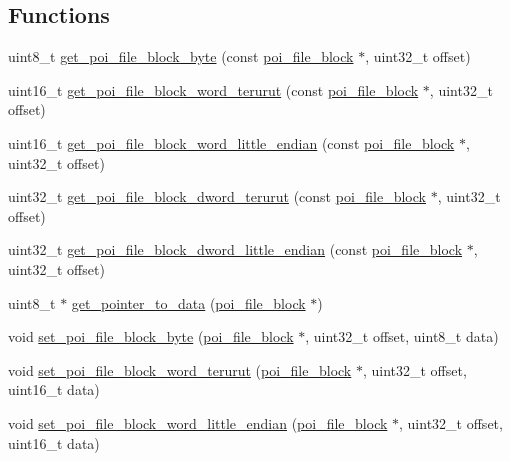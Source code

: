 \subsection*{Functions}
\begin{DoxyCompactItemize}
\item 
uint8\-\_\-t \hyperlink{file-manager_8h_a7583daf78dde7ba0c00ebd4f71e567c8}{get\-\_\-poi\-\_\-file\-\_\-block\-\_\-byte} (const \hyperlink{structpoi__file__block}{poi\-\_\-file\-\_\-block} $\ast$, uint32\-\_\-t offset)
\item 
uint16\-\_\-t \hyperlink{file-manager_8h_af304d02f29847f8e3cb2ba0f4d1a73e2}{get\-\_\-poi\-\_\-file\-\_\-block\-\_\-word\-\_\-terurut} (const \hyperlink{structpoi__file__block}{poi\-\_\-file\-\_\-block} $\ast$, uint32\-\_\-t offset)
\item 
uint16\-\_\-t \hyperlink{file-manager_8h_a359659add1dc2b5b76a93188eb0a1808}{get\-\_\-poi\-\_\-file\-\_\-block\-\_\-word\-\_\-little\-\_\-endian} (const \hyperlink{structpoi__file__block}{poi\-\_\-file\-\_\-block} $\ast$, uint32\-\_\-t offset)
\item 
uint32\-\_\-t \hyperlink{file-manager_8h_a1773530a1d5426887ae2fb624c1af210}{get\-\_\-poi\-\_\-file\-\_\-block\-\_\-dword\-\_\-terurut} (const \hyperlink{structpoi__file__block}{poi\-\_\-file\-\_\-block} $\ast$, uint32\-\_\-t offset)
\item 
uint32\-\_\-t \hyperlink{file-manager_8h_a8484d7ddf9453ad231f2e981d8b65205}{get\-\_\-poi\-\_\-file\-\_\-block\-\_\-dword\-\_\-little\-\_\-endian} (const \hyperlink{structpoi__file__block}{poi\-\_\-file\-\_\-block} $\ast$, uint32\-\_\-t offset)
\item 
uint8\-\_\-t $\ast$ \hyperlink{file-manager_8h_a8dc1f7e8d407d95f94fd36545d5c1cd7}{get\-\_\-pointer\-\_\-to\-\_\-data} (\hyperlink{structpoi__file__block}{poi\-\_\-file\-\_\-block} $\ast$)
\item 
void \hyperlink{file-manager_8h_a7a384897a233c03c2064472009b1ab05}{set\-\_\-poi\-\_\-file\-\_\-block\-\_\-byte} (\hyperlink{structpoi__file__block}{poi\-\_\-file\-\_\-block} $\ast$, uint32\-\_\-t offset, uint8\-\_\-t data)
\item 
void \hyperlink{file-manager_8h_aa63a6ad191dc36138e35c8bf669d6098}{set\-\_\-poi\-\_\-file\-\_\-block\-\_\-word\-\_\-terurut} (\hyperlink{structpoi__file__block}{poi\-\_\-file\-\_\-block} $\ast$, uint32\-\_\-t offset, uint16\-\_\-t data)
\item 
void \hyperlink{file-manager_8h_a535133ef3416b4274cd1846c954e6193}{set\-\_\-poi\-\_\-file\-\_\-block\-\_\-word\-\_\-little\-\_\-endian} (\hyperlink{structpoi__file__block}{poi\-\_\-file\-\_\-block} $\ast$, uint32\-\_\-t offset, uint16\-\_\-t data)

\end{DoxyCompactItemize}
